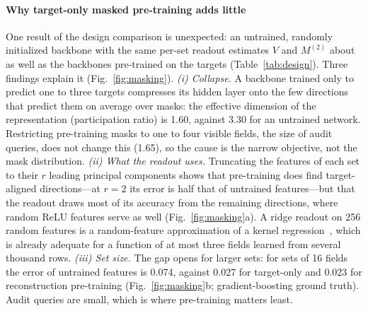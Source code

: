 \paragraph{Why target-only masked pre-training adds little}
One result of the design comparison is unexpected: an untrained, randomly initialized backbone with the same per-set
readout estimates $V$ and $M^{(2)}$ about as well as the backbones pre-trained on the targets
(Table~\ref{tab:design}). Three findings explain it (Fig.~\ref{fig:masking}).
\emph{(i) Collapse.} A backbone trained only to predict one to three targets compresses its hidden layer onto the few
directions that predict them on average over masks: the effective dimension of the representation (participation
ratio) is 1.60, against 3.30 for an untrained network. Restricting pre-training masks to one to four visible
fields, the size of audit queries, does not change this (1.65), so the cause is the narrow objective, not the mask
distribution. \emph{(ii) What the readout uses.} Truncating the features of each set to their $r$ leading principal
components shows that pre-training does find target-aligned directions---at $r=2$ its error is half that of untrained
features---but that the readout draws most of its accuracy from the remaining directions, where random ReLU features
serve as well (Fig.~\ref{fig:masking}a). A ridge readout on 256 random features is a random-feature approximation of a
kernel regression~\cite{rahimi2007random}, which is already adequate for a function of at most three fields learned
from several thousand rows. \emph{(iii) Set size.} The gap opens for larger sets: for sets of 16 fields the error of
untrained features is 0.074, against 0.027 for target-only and 0.023 for reconstruction pre-training
(Fig.~\ref{fig:masking}b; gradient-boosting ground truth). Audit queries are small, which is where pre-training matters
least.

